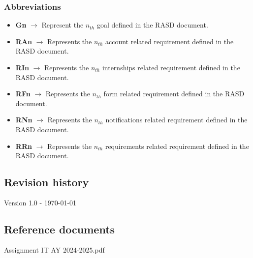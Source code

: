 \documentclass[11pt,twoside]{article}
\begin{document}
		\subsubsection{Abbreviations}
		\begin{itemize}
		\item \textbf{Gn} $\rightarrow$ Represent the $n_{th}$ goal defined in the RASD document.
		\item \textbf{RAn} $\rightarrow$ Represents the $n_{th}$ account related requirement defined in the RASD document.
		\item \textbf{RIn} $\rightarrow$ Represents the $n_{th}$ internships related requirement defined in the RASD document.
		\item \textbf{RFn} $\rightarrow$ Represents the $n_{th}$ form related requirement defined in the RASD document.
		\item \textbf{RNn} $\rightarrow$ Represents the $n_{th}$ notifications related requirement defined in the RASD document.
		\item \textbf{RRn} $\rightarrow$ Represents the $n_{th}$ requirements related requirement defined in the RASD document.
		\end{itemize}

	\subsection{Revision history}
Version 1.0 - \today

	\subsection{Reference documents}
Assignment IT AY 2024-2025.pdf
\end{document}
